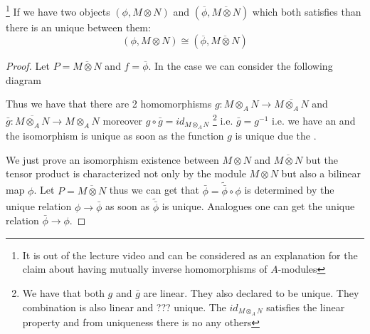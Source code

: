 \begin{lemma}
  \footnote{
    It is out of the lecture video and can be considered as an
    explanation for the claim about having mutually inverse
    homomorphisms of $A$-modules
  }
  If we have two objects $\left(\phi, M \otimes N\right)$
  and $\left(\overline{\phi},\overline{M \otimes N}\right)$
  which both satisfies  than there is
  an unique  between them: 
  \[
  \left(\phi, M \otimes N\right) \cong \left(\overline{\phi},
  \overline{M \otimes N}\right)
  \]
\begin{proof}
Let $P = \overline{M \otimes N}$ and $f =
\overline{\phi}$. In 
the case we can consider the following diagram


Thus we have that there are 2 homomorphisms
$g :  M \otimes_A N \to \overline{ M \otimes_A N}$
and
$\bar{g} :  \overline{M \otimes_A N} \to M \otimes_A N$ moreover
$g \circ \bar{g} = id_{M \otimes_A N}$
\footnote{
  We have that both $g$ and $\bar{g}$ are linear. They also declared
  to be unique. They combination is also linear and ??? unique. The
  $id_{M \otimes_A N}$ satisfies the linear property and from
  uniqueness there is no any others
}
i.e. $\bar{g} = g^{-1}$ i.e. we have an
 and the isomorphism is unique as soon as the
function $g$ is unique due the .

We just prove an isomorphism existence between
$M \otimes N$ and $\overline{M \otimes N}$ but the tensor product is
characterized not only by the module $M \otimes N$
but also a bilinear map $\phi$. Let $P = \overline{M \otimes N}$ thus
we can get that $\bar{\phi} = \tilde{\bar{\phi}} \circ \phi$ is
determined by the unique
relation $\phi \to \bar{\phi}$ as soon as
$\tilde{\bar{\phi}}$ is unique.
Analogues one can get the unique relation
$\bar{\phi} \to \phi$.
\end{proof}
\label{lem:universalpropertyuniqueness}
\end{lemma}

